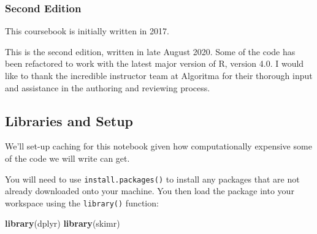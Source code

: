 \documentclass[]{article}
\newenvironment{Shaded}{\begin{snugshade}}{\end{snugshade}}
\newcommand{\CommentTok}[1]{\textcolor[rgb]{0.56,0.35,0.01}{\textit{#1}}}
\newcommand{\DataTypeTok}[1]{\textcolor[rgb]{0.13,0.29,0.53}{#1}}
\newcommand{\DecValTok}[1]{\textcolor[rgb]{0.00,0.00,0.81}{#1}}
\newcommand{\KeywordTok}[1]{\textcolor[rgb]{0.13,0.29,0.53}{\textbf{#1}}}
\newcommand{\NormalTok}[1]{#1}
\newcommand{\OperatorTok}[1]{\textcolor[rgb]{0.81,0.36,0.00}{\textbf{#1}}}
\newcommand{\OtherTok}[1]{\textcolor[rgb]{0.56,0.35,0.01}{#1}}
\newcommand{\StringTok}[1]{\textcolor[rgb]{0.31,0.60,0.02}{#1}}
\begin{document}
\hypertarget{second-edition}{%
\subsubsection{Second Edition}\label{second-edition}}

This coursebook is initially written in 2017.

This is the second edition, written in late August 2020. Some of the
code has been refactored to work with the latest major version of R,
version 4.0. I would like to thank the incredible instructor team at
Algoritma for their thorough input and assistance in the authoring and
reviewing process.

\hypertarget{libraries-and-setup}{%
\subsection{Libraries and Setup}\label{libraries-and-setup}}

We'll set-up caching for this notebook given how computationally
expensive some of the code we will write can get.

\begin{Shaded}
\end{Shaded}

You will need to use \texttt{install.packages()} to install any packages
that are not already downloaded onto your machine. You then load the
package into your workspace using the \texttt{library()} function:

\begin{Shaded}
\begin{Highlighting}[]
\KeywordTok{library}\NormalTok{(dplyr)}
\KeywordTok{library}\NormalTok{(skimr)}
\end{Highlighting}
\end{Shaded}
\end{document}
